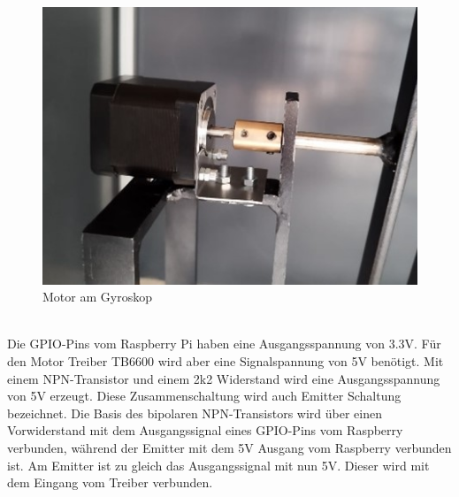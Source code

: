 \begin{figure}[H]
    \centering
    \includegraphics[scale=1.1]{image/motorgyros.jpg}
    \caption{Motor am Gyroskop}
    \label{fig:enter-label}
\end{figure}
\\
\vspace{2mm}
Die GPIO-Pins\label{sec: 5V} vom Raspberry Pi haben eine Ausgangsspannung von 3.3V. Für den Motor Treiber TB6600 wird aber eine Signalspannung von 5V benötigt. Mit einem NPN-Transistor und einem 2k2 Widerstand wird eine Ausgangsspannung von 5V erzeugt. Diese Zusammenschaltung wird auch Emitter Schaltung bezeichnet. Die Basis des bipolaren NPN-Transistors wird über einen Vorwiderstand mit dem Ausgangssignal eines GPIO-Pins vom Raspberry verbunden, während der Emitter mit dem 5V Ausgang vom Raspberry verbunden ist. Am Emitter ist zu gleich das Ausgangssignal mit nun 5V. Dieser wird mit dem Eingang vom Treiber verbunden. 